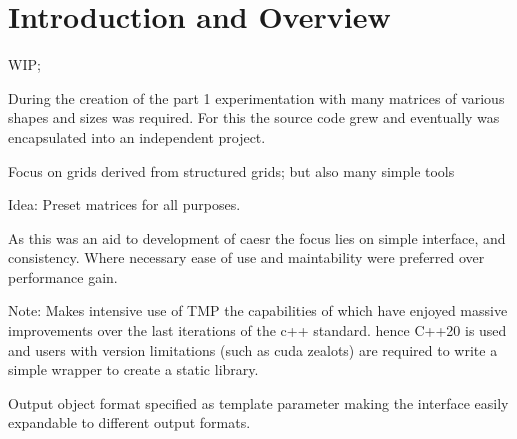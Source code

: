 \chapter{Introduction and Overview} \label{sec:matrixgen-intro}

WIP;

During the creation of the part 1 experimentation with many matrices of various shapes and sizes was required. For this
the source code grew and eventually was encapsulated into an independent project.

Focus on grids derived from structured grids; but also many simple tools

Idea: Preset matrices for all purposes.

As this was an aid to development of caesr the focus lies on simple interface, and consistency. Where necessary ease of
use and maintability were preferred over performance gain.

Note: Makes intensive use of TMP the capabilities of which have enjoyed massive improvements over the last iterations of
the c++ standard. hence C++20 is used and users with version limitations (such as cuda zealots) are required to write a
simple wrapper to create a static library.

Output object format specified as template parameter making the interface easily expandable to different
output formats.
